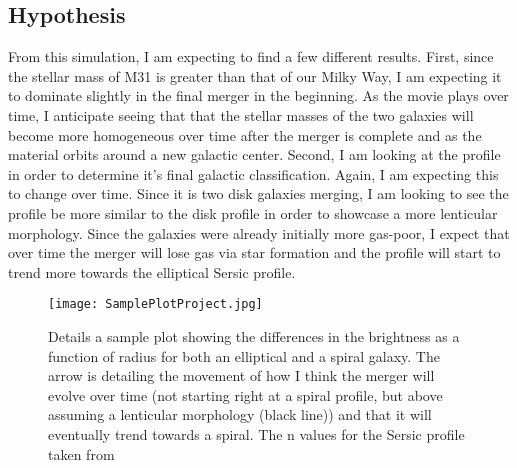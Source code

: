 \documentclass[twocolumn]{aastex63}
\begin{document}
\subsection{Hypothesis}
From this simulation, I am expecting to find a few different results. First, since the stellar mass of M31 is greater than that of our Milky Way, I am expecting it to dominate slightly in the final merger in the beginning. As the movie plays over time, I anticipate seeing that that the stellar masses of the two galaxies will become more homogeneous over time after the merger is complete and as the material orbits around a new galactic center. Second, I am looking at the profile in order to determine it's final galactic classification. Again, I am expecting this to change over time. Since it is two disk galaxies merging, I am looking to see the profile be more similar to the disk profile in order to showcase a more lenticular morphology. Since the galaxies were already initially more gas-poor, I expect that over time the merger will lose gas via star formation and the profile will start to trend more towards the elliptical Sersic profile. 

{}


\begin{figure}
    \centering
    \texttt{[image: SamplePlotProject.jpg]}
    \caption{Details a sample plot showing the differences in the brightness as a function of radius for both an elliptical and a spiral galaxy. The arrow is detailing the movement of how I think the merger will evolve over time (not starting right at a spiral profile, but above assuming a lenticular morphology (black line)) and that it will eventually trend towards a spiral. The n values for the Sersic profile taken from \citep{2001MNRAS.326..869T}}
    \label{fig:my_label}
\end{figure}
\end{document}
